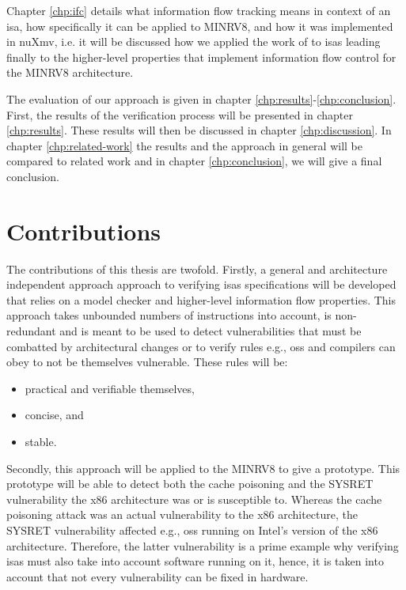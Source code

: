 Chapter \ref{chp:ifc} details what information flow tracking means in context of an \gls{isa}, how specifically it can be applied to MINRV8, and how it was implemented in nuXmv, i.e. it will be discussed how we applied the work of \citeauthor{Ferraiuolo17} \cite{Ferraiuolo17} to \glspl{isa} leading finally to the higher-level properties that implement information flow control for the MINRV8 architecture.

The evaluation of our approach is given in chapter \ref{chp:results}-\ref{chp:conclusion}.
First, the results of the verification process will be presented in chapter \ref{chp:results}.
These results will then be discussed in chapter \ref{chp:discussion}.
In chapter \ref{chp:related-work} the results and the approach in general will be compared to related work and in chapter \ref{chp:conclusion}, we will give a final conclusion.

\section{Contributions}

The contributions of this thesis are twofold.
Firstly, a general and architecture independent approach approach to verifying \glspl{isa} specifications will be developed that relies on a model checker and higher-level information flow properties.
This approach takes unbounded numbers of instructions into account, is non-redundant and is meant to be used to detect vulnerabilities that must be combatted by architectural changes or to verify rules e.g., \glspl{os} and compilers can obey to not be themselves vulnerable.
These rules will be:
\begin{itemize}
    \item practical and verifiable themselves,
    \item concise, and
    \item stable.
\end{itemize}

Secondly, this approach will be applied to the MINRV8 to give a prototype.
This prototype will be able to detect both the cache poisoning and the SYSRET vulnerability the x86 architecture was or is susceptible to.
Whereas the cache poisoning attack was an actual vulnerability to the x86 architecture, the SYSRET vulnerability affected e.g., \glspl{os} running on Intel's version of the x86 architecture.
Therefore, the latter vulnerability is a prime example why verifying \glspl{isa} must also take into account software running on it, hence, it is taken into account that not every vulnerability can be fixed in hardware.
